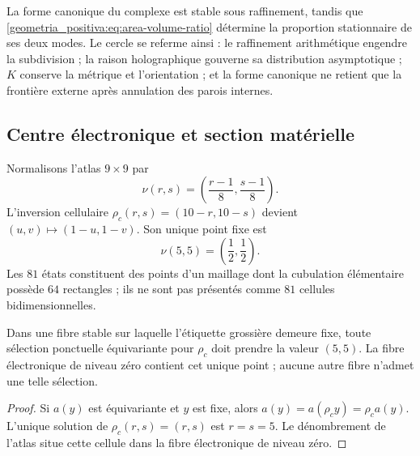La forme canonique du complexe est stable sous raffinement, tandis que \eqref{geometria_positiva:eq:area-volume-ratio} détermine la proportion stationnaire de ses deux modes. Le cercle se referme ainsi : le raffinement arithmétique engendre la subdivision ; la raison holographique gouverne sa distribution asymptotique ; \(K\) conserve la métrique et l’orientation ; et la forme canonique ne retient que la frontière externe après annulation des parois internes.

\subsection{Centre électronique et section matérielle}

Normalisons l’atlas \(9\times9\) par
\[
 \nu(r,s)=\left(\frac{r-1}{8},\frac{s-1}{8}\right).
\]
L’inversion cellulaire \(\rho_c(r,s)=(10-r,10-s)\) devient \((u,v)\mapsto(1-u,1-v)\). Son unique point fixe est
\begin{equation}
 \nu(5,5)=\left(\frac12,\frac12\right).
 \label{geometria_positiva:eq:electron-center}
\end{equation}
Les \(81\) états constituent des points d’un maillage dont la cubulation élémentaire possède \(64\) rectangles ; ils ne sont pas présentés comme \(81\) cellules bidimensionnelles.

\begin{theorem}
\label{geometria_positiva:thm:electron-equivariant-section} Dans une fibre stable sur laquelle l’étiquette grossière demeure fixe, toute sélection ponctuelle équivariante pour \(\rho_c\) doit prendre la valeur \((5,5)\). La fibre électronique de niveau zéro contient cet unique point ; aucune autre fibre n’admet une telle sélection.
\end{theorem}
\begin{proof}
Si \(a(y)\) est équivariante et \(y\) est fixe, alors \(a(y)=a(\rho_cy)=\rho_ca(y)\). L’unique solution de \(\rho_c(r,s)=(r,s)\) est \(r=s=5\). Le dénombrement de l’atlas situe cette cellule dans la fibre électronique de niveau zéro.
\end{proof}

